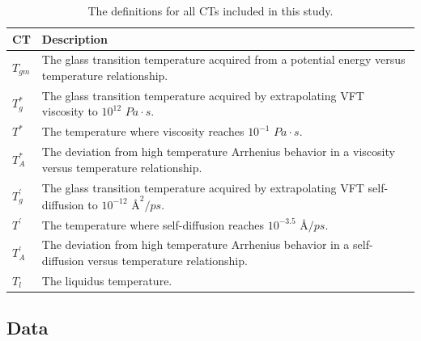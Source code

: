\documentclass[11pt,a4paper]{article}                                %
\begin{document}
\begin{table}[H]
\centering
\caption{The definitions for all CTs included in this study.}
\begin{tabular}{|l|p{10cm}|}
\hline
CT                                & Description                                                                                                           \\ \hline
\hline
$T_{gm}$                          & The glass transition temperature acquired from a potential energy versus temperature relationship.                    \\ \hline
$T_{g}^{*}$                       & The glass transition temperature acquired by extrapolating VFT viscosity to $10^{12}$ $Pa \cdot s$.              \\ \hline
$T^{*}$                           & The temperature where viscosity reaches $10^{-1}$ $Pa \cdot s$.                                                    \\ \hline
$T_{A}^{*}$                       & The deviation from high temperature Arrhenius behavior in a viscosity versus temperature relationship.                \\ \hline
$T_{g}^{'}$                       & The glass transition temperature acquired by extrapolating VFT self-diffusion to $10^{-12}$ $\text{\AA}^{2}/ps$. \\ \hline
$T^{'}$                           & The temperature where self-diffusion reaches $10^{-3.5}$ $\text{\AA}/ps$.                                          \\ \hline
$T_{A}^{'}$                       & The deviation from high temperature Arrhenius behavior in a self-diffusion versus temperature relationship.           \\ \hline
$T_{l}$                           & The liquidus temperature.                                                                                             \\ \hline
\end{tabular}
\label{CTs_def}
\end{table}

\subsection{Data}\label{sect_data}
\end{document}
